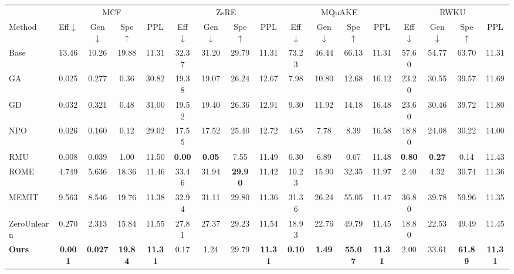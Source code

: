 \begin{table}[t]
\centering
\small
\setlength{\tabcolsep}{3.2pt}
\begin{tabular}{l cccc cccc cccc cccc}
\toprule
& \multicolumn{4}{c}{MCF} & \multicolumn{4}{c}{ZsRE} & \multicolumn{4}{c}{MQuAKE} & \multicolumn{4}{c}{RWKU} \\
\cmidrule(lr){2-5}\cmidrule(lr){6-9}\cmidrule(lr){10-13}\cmidrule(lr){14-17}
Method & Eff$\downarrow$ & Gen$\downarrow$ & Spe$\uparrow$ & PPL & Eff$\downarrow$ & Gen$\downarrow$ & Spe$\uparrow$ & PPL & Eff$\downarrow$ & Gen$\downarrow$ & Spe$\uparrow$ & PPL & Eff$\downarrow$ & Gen$\downarrow$ & Spe$\uparrow$ & PPL \\
\midrule
Base        & 13.46 & 10.26 & 19.88 & 11.31 & 32.37 & 31.20 & 29.79 & 11.31 & 73.23 & 46.44 & 66.13 & 11.31 & 57.60 & 54.77 & 63.70 & 11.31 \\
\midrule
GA          & 0.025 & 0.277 & 0.36 & 30.82 & 19.38 & 19.07 & 26.24 & 12.67 & 7.98 & 10.80 & 12.68 & 16.12 & 23.20 & 30.55 & 39.57 & 11.69 \\
GD          & 0.032 & 0.321 & 0.48 & 31.00 & 19.52 & 19.40 & 26.36 & 12.91 & 9.30 & 11.92 & 14.18 & 16.48 & 23.60 & 30.46 & 39.72 & 11.80 \\
NPO         & 0.026 & 0.160 & 0.12 & 29.02 & 17.55 & 17.52 & 25.40 & 12.72 & 4.65 & 7.78 & 8.39 & 16.58 & 18.80 & 24.08 & 30.22 & 14.00 \\
RMU         & 0.008 & 0.039 & 1.00 & 11.50 & \textbf{0.00} & \textbf{0.05} & 7.55 & 11.49 & 0.30 & 6.89 & 0.67 & 11.48 & \textbf{0.80} & \textbf{0.27} & 0.14 & 11.43 \\
ROME        & 4.749 & 5.636 & 18.36 & 11.46 & 33.46 & 31.94 & \textbf{29.90} & 11.42 & 10.23 & 15.90 & 32.35 & 11.97 & 2.40 & 4.32 & 30.74 & 11.36 \\
MEMIT       & 9.563 & 8.546 & 19.76 & 11.38 & 32.94 & 31.11 & 29.80 & 11.36 & 31.36 & 26.24 & 55.05 & 11.47 & 36.80 & 39.78 & 59.96 & 11.35 \\
ZeroUnlearn & 0.270 & 2.313 & 15.84 & 11.55 & 27.81 & 27.37 & 29.23 & 11.54 & 18.93 & 22.76 & 49.79 & 11.45 & 18.80 & 22.53 & 49.49 & 11.45 \\
\textbf{Ours} & \textbf{0.001} & \textbf{0.027} & \textbf{19.84} & \textbf{11.31} & 0.17 & 1.24 & 29.79 & \textbf{11.31} & \textbf{0.10} & \textbf{1.49} & \textbf{55.07} & \textbf{11.31} & 2.00 & 33.61 & \textbf{61.89} & \textbf{11.31} \\

\end{tabular}
\end{table}
